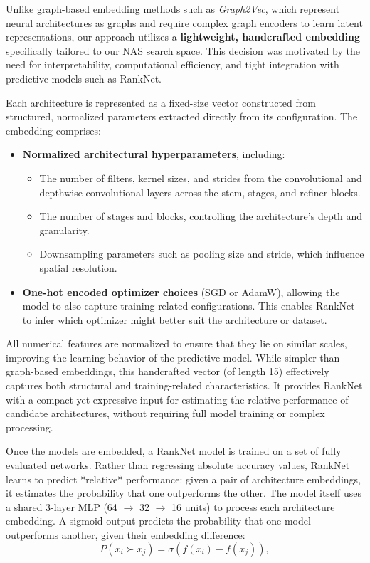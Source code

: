 Unlike graph-based embedding methods such as \textit{Graph2Vec}, which represent neural architectures as graphs and require complex graph encoders to learn latent representations, our approach utilizes a \textbf{lightweight, handcrafted embedding} specifically tailored to our NAS search space. This decision was motivated by the need for interpretability, computational efficiency, and tight integration with predictive models such as RankNet.

Each architecture is represented as a fixed-size vector constructed from structured, normalized parameters extracted directly from its configuration. The embedding comprises:

\begin{itemize}
    \item \textbf{Normalized architectural hyperparameters}, including:
    \begin{itemize}
        \item The number of filters, kernel sizes, and strides from the convolutional and depthwise convolutional layers across the stem, stages, and refiner blocks.
        \item The number of stages and blocks, controlling the architecture’s depth and granularity.
        \item Downsampling parameters such as pooling size and stride, which influence spatial resolution.
    \end{itemize}
    \item \textbf{One-hot encoded optimizer choices} (SGD or AdamW), allowing the model to also capture training-related configurations. This enables RankNet to infer which optimizer might better suit the architecture or dataset.
\end{itemize}

All numerical features are normalized to ensure that they lie on similar scales, improving the learning behavior of the predictive model. While simpler than graph-based embeddings, this handcrafted vector (of length 15) effectively captures both structural and training-related characteristics. It provides RankNet with a compact yet expressive input for estimating the relative performance of candidate architectures, without requiring full model training or complex processing.

Once the models are embedded, a RankNet model is trained on a set of fully evaluated networks. Rather than regressing absolute accuracy values, RankNet learns to predict *relative* performance: given a pair of architecture embeddings, it estimates the probability that one outperforms the other. The model itself uses a shared 3-layer MLP (64 $\rightarrow$ 32 $\rightarrow$ 16 units) to process each architecture embedding. A sigmoid output predicts the probability that one model outperforms another, given their embedding difference:
\begin{equation}
    P(x_i \succ x_j) = \sigma(f(x_i) - f(x_j)),
\end{equation}

